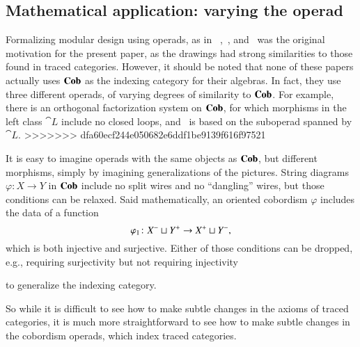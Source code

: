 \documentclass[12pt,oneside,article,draft]{memoir}
\begin{document}
\begin{enumerate}
\subsection{Mathematical application: varying the operad}

Formalizing modular design using operads, as in ~\cite{Spivak},~\cite{RupelSpivak}, and~\cite{VagnerSpivakLerman} was the original motivation for the present paper, as the drawings had strong similarities to those found in traced categories. However, it should be noted that none of these papers actually uses $\mathbf{Cob}$ as the indexing category for their algebras. In fact, they use three different operads, of varying degrees of similarity to $\mathbf{Cob}$. For example, there is an orthogonal factorization system on $\mathbf{Cob}$, for which morphisms in the left class $\cat{L}$ include no closed loops, and~\cite{VagnerSpivakLerman} is based on the suboperad spanned by $\cat{L}$.
>>>>>>> dfa60ecf244e050682e6ddf1be9139f616f97521

It is easy to imagine operads with the same objects as $\mathbf{Cob}$, but different morphisms, simply by imagining generalizations of the pictures.
String diagrams $\varphi\colon X\to Y$ in $\mathbf{Cob}$ include no split wires and no ``dangling'' wires, but those conditions can be relaxed.
Said mathematically, an oriented cobordism $\varphi$ includes the data of a function
$$\varphi_1\colon X^-\sqcup Y^+\to X^+\sqcup Y^-,$$
which is both injective and surjective.
Either of those conditions can be dropped, e.g., requiring surjectivity but not requiring injectivity
\begin{center}
\end{center}
to generalize the indexing category. 

So while it is difficult to see how to make subtle changes in the axioms of traced categories, it is much more straightforward to see how to make subtle changes in the cobordism operads, which index traced categories.


\end{enumerate}
\end{document}
